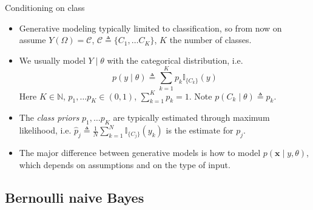 \documentclass{beamer}
\numberwithin{equation}{section}
\begin{document}
\begin{frame}{Conditioning on class}
    \begin{itemize}
        \item
        Generative modeling typically limited to classification, so from now on
        assume $ Y(\Omega) = \mathcal{C} $, $ \mathcal{C} \triangleq \{C_1,
        \ldots C_K\} $, $ K $ the number of classes.

        \item
        We usually model $ Y \mid \theta $ with the categorical distribution,
        i.e.
        \begin{equation} \label{cat_dist_like}
            p(y \mid \theta) \triangleq
            \sum_{k = 1}^Kp_k\mathbb{I}_{\{C_k\}}(y)
        \end{equation}
        Here $ K \in \mathbb{N} $, $ p_1, \ldots p_K \in (0, 1) $,
        $ \sum_{k = 1}^Kp_k = 1 $. Note $ p(C_k \mid \theta) \triangleq p_k $.

        \item        
        The \textit{class priors} $ p_1, \ldots p_K $ are typically estimated
        through maximum likelihood, i.e. $ \hat{p}_j \triangleq \frac{1}{N}
        \sum_{k = 1}^N\mathbb{I}_{\{C_j\}}(y_k) $ is the estimate for $ p_j $.

        \item
        The major difference between generative models is how to model
        $ p(\mathbf{x} \mid y, \theta) $, which depends on assumptions and on
        the type of input.
    \end{itemize}
\end{frame}

\subsection{Bernoulli naive Bayes}
\end{document}
